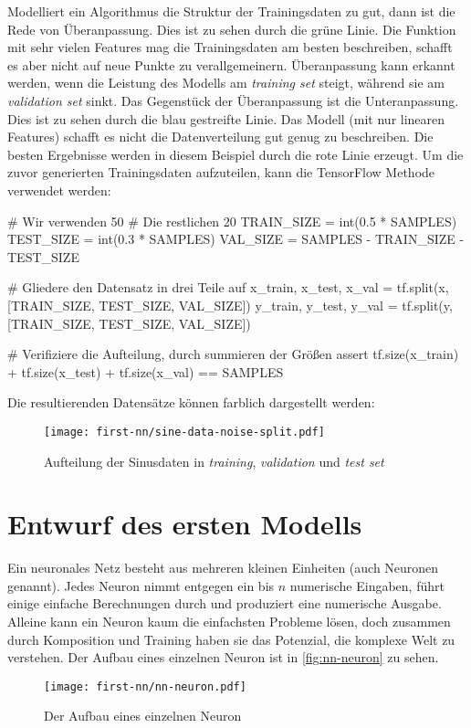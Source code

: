 \noindent
Modelliert ein Algorithmus die Struktur der Trainingsdaten zu gut, dann
ist die Rede von Überanpassung. Dies ist zu sehen
durch die grüne Linie. Die Funktion mit sehr vielen Features
mag die Trainingsdaten am besten beschreiben,
schafft es aber nicht auf neue Punkte zu verallgemeinern.
Überanpassung kann erkannt werden, wenn die Leistung des Modells am
\textit{training set} steigt, während sie am \textit{validation set}
sinkt. Das Gegenstück der Überanpassung ist die
Unteranpassung. Dies ist zu sehen durch die blau gestreifte Linie.
Das Modell (mit nur linearen Features)
schafft es nicht die Datenverteilung gut genug zu beschreiben.
Die besten Ergebnisse werden in diesem Beispiel durch die rote Linie erzeugt.
Um die zuvor generierten Trainingsdaten aufzuteilen,
kann die TensorFlow Methode 
verwendet werden:
\begin{pythoncode}
# Wir verwenden 50%
# Die restlichen 20%
TRAIN_SIZE = int(0.5 * SAMPLES)
TEST_SIZE = int(0.3 * SAMPLES)
VAL_SIZE = SAMPLES - TRAIN_SIZE - TEST_SIZE

# Gliedere den Datensatz in drei Teile auf
x_train, x_test, x_val = tf.split(x, [TRAIN_SIZE, TEST_SIZE, VAL_SIZE])
y_train, y_test, y_val = tf.split(y, [TRAIN_SIZE, TEST_SIZE, VAL_SIZE])

# Verifiziere die Aufteilung, durch summieren der Größen
assert tf.size(x_train) + tf.size(x_test) + tf.size(x_val) == SAMPLES
\end{pythoncode}
Die resultierenden Datensätze können farblich dargestellt werden:
\begin{figure}[h!]
  \centering
  \texttt{[image: first-nn/sine-data-noise-split.pdf]}
  \caption{Aufteilung der Sinusdaten in
  \textit{training}, \textit{validation} und \textit{test set}}
\end{figure}

\section{Entwurf des ersten Modells}
\label{sec:modellentwurf}
Ein neuronales Netz besteht aus mehreren kleinen Einheiten (auch Neuronen genannt).
Jedes Neuron nimmt entgegen ein bis $n$ numerische Eingaben, führt einige
einfache Berechnungen durch und produziert eine numerische Ausgabe.
Alleine kann ein Neuron kaum die einfachsten Probleme lösen, doch zusammen
durch Komposition und Training haben sie das Potenzial,
die komplexe Welt zu verstehen.
Der Aufbau eines einzelnen Neuron ist in \autoref{fig:nn-neuron} zu sehen.
\begin{figure}[h!]
  \centering
  \texttt{[image: first-nn/nn-neuron.pdf]}
  \caption{Der Aufbau eines einzelnen Neuron}
  \label{fig:nn-neuron}
\end{figure}

